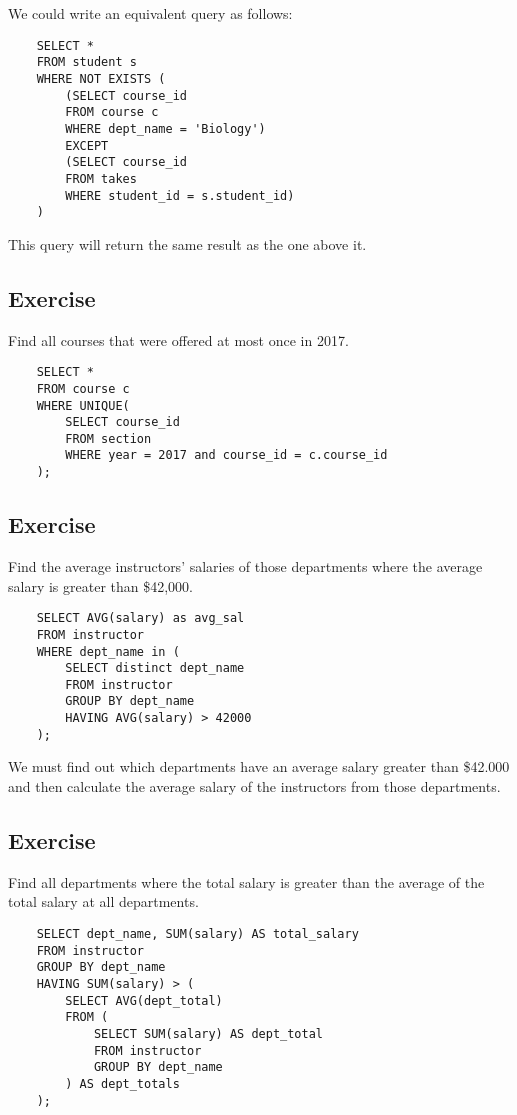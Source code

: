 \documentclass{article}
\begin{document}
We could write an equivalent query as follows:
\begin{lstlisting}
    SELECT * 
    FROM student s
    WHERE NOT EXISTS (
        (SELECT course_id
        FROM course c
        WHERE dept_name = 'Biology')
        EXCEPT
        (SELECT course_id
        FROM takes
        WHERE student_id = s.student_id)
    )
\end{lstlisting}
\noindent This query will return the same result as the one above it.

\vspace{4mm}
\subsection{Exercise}
\noindent Find all courses that were offered at most once in 2017.
\begin{lstlisting}
    SELECT *
    FROM course c
    WHERE UNIQUE(
        SELECT course_id
        FROM section
        WHERE year = 2017 and course_id = c.course_id
    );
\end{lstlisting}

\vspace{4mm}
\subsection{Exercise}
\noindent Find the average instructors’ salaries of those departments where the
average salary is greater than \$42,000.
\begin{lstlisting}
    SELECT AVG(salary) as avg_sal
    FROM instructor
    WHERE dept_name in (
        SELECT distinct dept_name
        FROM instructor
        GROUP BY dept_name
        HAVING AVG(salary) > 42000
    );
\end{lstlisting}
We must find out which departments have an average salary greater than
\$42.000 and then calculate the average salary of the instructors from
those departments.
\newpage
\subsection{Exercise}
\noindent  Find all departments where the total salary is greater than the average of
the total salary at all departments.
\begin{lstlisting}
    SELECT dept_name, SUM(salary) AS total_salary
    FROM instructor
    GROUP BY dept_name
    HAVING SUM(salary) > (
        SELECT AVG(dept_total)
        FROM (
            SELECT SUM(salary) AS dept_total
            FROM instructor
            GROUP BY dept_name
        ) AS dept_totals
    );    
\end{lstlisting}
\end{document}
